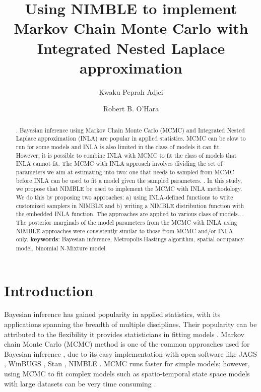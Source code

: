 \documentclass[
]{article}
\title{Using NIMBLE to implement Markov Chain Monte Carlo with
Integrated Nested Laplace approximation}
\author[1,2]{Kwaku Peprah Adjei}
\author[1,2]{Robert B. O'Hara}
\affil[1]{Department of Mathematical Sciences, Norwegian University of
Science and Technology, Trondheim Norway}
\affil[2]{Center for Biodiversity Dynamics, Norwegian University of
Science and Technology, Trondheim Norway}
\date{}
\begin{document}
\maketitle
\begin{abstract}
. Bayesian inference using Markov Chain Monte Carlo (MCMC)
and Integrated Nested Laplace approximation (INLA) are popular in
applied statistics. MCMC can be slow to run for some models and INLA is
also limited in the class of models it can fit. However, it is possible
to combine INLA with MCMC to fit the class of models that INLA cannot
fit. The MCMC with INLA approach involves dividing the set of parameters
we aim at estimating into two: one that needs to sampled from MCMC
before INLA can be used to fit a model given the sampled parameters.
. In this study, we propose that NIMBLE be used to implement
the MCMC with INLA methodology. We do this by proposing two approaches:
a) using INLA-defined functions to write customized samplers in NIMBLE
and b) writing a NIMBLE distribution function with the embedded INLA
function. The approaches are applied to various class of models.
. The posterior marginals of the model parameters from the
MCMC with INLA using NIMBLE approaches were consistently similar to
those from MCMC and/or INLA only. \newline \textbf{keywords}: Bayesian
inference, Metropolis-Hastings algorithm, spatial occupancy model,
binomial N-Mixture model
\end{abstract}
\ifdefined\Shaded\renewenvironment{Shaded}{\begin{tcolorbox}[breakable, enhanced, sharp corners, borderline west={3pt}{0pt}{shadecolor}, frame hidden, interior hidden, boxrule=0pt]}{\end{tcolorbox}}\fi

\hypertarget{introduction}{%
\section{Introduction}\label{introduction}}

Bayesian inference has gained popularity in applied statistics, with its
applications spanning the breadth of multiple disciplines. Their
popularity can be attributed to the flexibility it provides
statisticians in fitting models \citep{blangiardo2015spatial}. Markov
chain Monte Carlo (MCMC) method is one of the common approaches used for
Bayesian inference
\citep{gilks1995markov, brooks2011handbook, blangiardo2015spatial, kery2015applied},
due to its easy implementation with open software like JAGS
\citep{hornik2003jags}, WinBUGS \citep{spiegelhalter2014winbugs}, Stan
\citep{carpenter2017stan}, NIMBLE \citep{nimblearticle}. MCMC runs
faster for simple models; however, using MCMC to fit complex models such
as spatio-temporal state space models with large datasets can be very
time consuming \citep{blangiardo2015spatial, kery2020applied}.
\end{document}
